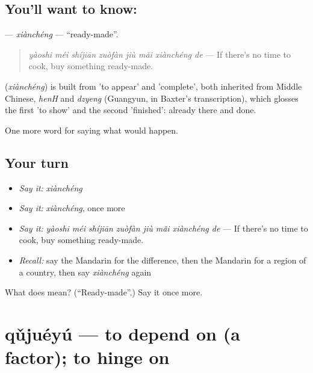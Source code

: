 \subsection*{You'll want to know: }
\textbf{} — \emph{xiànchéng} — \textquotedblleft{}ready-made\textquotedblright{}.

\begin{quote}
\textbf{} \emph{yàoshi méi shíjiān zuòfàn jiù mǎi xiànchéng de} — If there's no time to cook, buy something ready-made.
\end{quote}

\begin{cousinweb}
\textbf{} (\emph{xiànchéng}) is built from  'to appear' and  'complete', both inherited from Middle Chinese, \emph{henH} and \emph{dzyeng} (Guangyun, in Baxter's transcription), which glosses the first 'to show' and the second 'finished': already there and done.
\end{cousinweb}

\begin{grammarlens}[title={What you've built}]
One more word for saying what would happen.
\end{grammarlens}

\subsection*{Your turn}
\begin{itemize}
\raggedright
  \item \emph{Say it:} \emph{xiànchéng}
  \item \emph{Say it:} \emph{xiànchéng}, once more
  \item \emph{Say it:} \emph{yàoshi méi shíjiān zuòfàn jiù mǎi xiànchéng de} — If there's no time to cook, buy something ready-made.
  \item \emph{Recall:} say the Mandarin for the difference, then the Mandarin for a region of a country, then say \emph{xiànchéng} again
\end{itemize}

\begin{tcolorbox}[breakable,colback=teal!4,colframe=teal!35!black,title={Before you move on}]
What does  mean? (\textquotedblleft{}Ready-made\textquotedblright{}.) Say it once more.
\end{tcolorbox}
\section[qǔjuéyú]{qǔjuéyú — to depend on (a factor); to hinge on}

